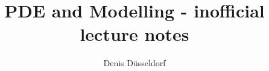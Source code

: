 \documentclass[11pt, USenglish, oneside]{book}
\begin{document}

\begin{titlepage}
 		\title{PDE and Modelling - inofficial lecture notes}
 		\author{Denis Düsseldorf}
\end{titlepage}
\maketitle

\tableofcontents

\mainmatter
{}


	
	
	

\backmatter
\cleardoublepage
{}
{}


\end{document}
